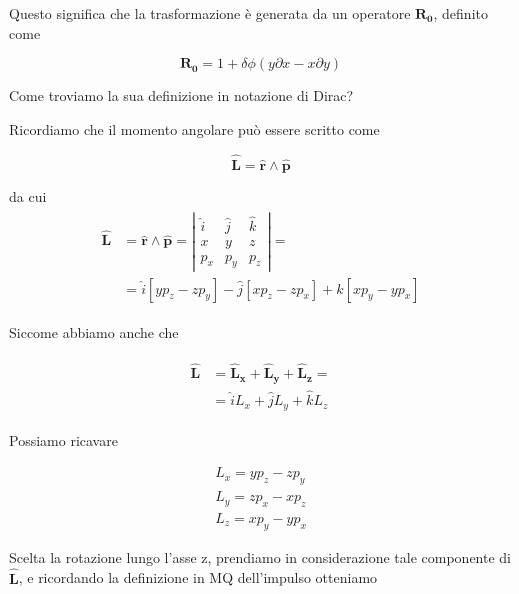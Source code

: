 Questo significa che la trasformazione è generata da un operatore $\mathbf{R_0}$, definito come

\begin{equation}
\mathbf{R_0} =  1 + \delta \phi \left( y \partial x - x \partial y \right)
\end{equation}

Come troviamo la sua definizione in notazione di Dirac? \newline

Ricordiamo che il momento angolare può essere scritto come 

\begin{equation}
\mathbf{\hat L} = \mathbf{\hat r} \wedge \mathbf{\hat p}
\end{equation}

da cui
\begin{align}
\begin{split}
\mathbf{\hat L} {}& = \mathbf{\hat r} \wedge \mathbf{\hat p} = 
\left|\begin{array}{ccc}\hat i & \hat j & \hat k \\ x & y & z \\ p_x & p_y & p_z \end{array}\right| =  \\
&= \hat i [y p_z - zp_y] - \hat j [x p_z - zp_x] + \hat k [x p_y - yp_x]
\end{split}
\end{align}

\newpage

Siccome abbiamo anche che

\begin{align}
\begin{split}
\mathbf{\hat L} {}&= \mathbf{\hat L_x} + \mathbf{\hat L_y}  + \mathbf{\hat L_z}= \\
& = \hat i L_x + \hat j L_y + \hat k L_z 
\end{split}
\end{align}

Possiamo ricavare

\begin{align}
L_x= y p_z - z p_y \\
L_y= z p_x - x p_z \\
L_z= x p_y - y p_x
\end{align}

Scelta la rotazione lungo l'asse z, prendiamo in considerazione tale componente di $\mathbf{\hat L}$, e ricordando la definizione in MQ dell'impulso otteniamo


